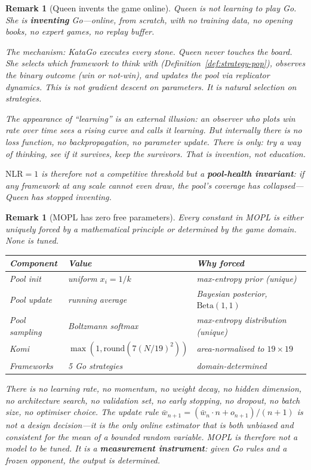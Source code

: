 \documentclass[11pt,a4paper]{article}
\newtheorem{remark}[theorem]{Remark}
\begin{document}
\begin{remark}[Queen invents the game online]\label{rem:queen-invents}
\color{black!60}%
Queen is not learning to play Go.
She is \textbf{inventing} Go---online, from scratch, with no
training data, no opening books, no expert games, no replay buffer.

The mechanism:
KataGo executes every stone.
Queen never touches the board.
She selects \emph{which framework to think with}
(Definition~\ref{def:strategy-pop}),
observes the binary outcome (win or not-win),
and updates the pool via replicator dynamics.
This is not gradient descent on parameters.
It is natural selection on strategies.

The appearance of ``learning'' is an external illusion:
an observer who plots win rate over time sees a rising curve
and calls it learning.
But internally there is no loss function, no backpropagation,
no parameter update.
There is only: try a way of thinking, see if it survives,
keep the survivors.
That is invention, not education.

$\mathrm{NLR} = 1$ is therefore not a competitive threshold
but a \textbf{pool-health invariant}:
if any framework at any scale cannot even draw,
the pool's coverage has collapsed---Queen has stopped inventing.
\end{remark}

\begin{remark}[MOPL has zero free parameters]\label{rem:zero-param}
\color{black!60}%
Every constant in MOPL is either uniquely forced by a mathematical
principle or determined by the game domain.
None is tuned.

\begin{center}
\small
\begin{tabular}{@{}l@{\;\;}l@{\;\;}l@{}}
\toprule
Component & Value & Why forced \\
\midrule
Pool init & uniform $x_i = 1/k$ &
  max-entropy prior (unique) \\
Pool update & running average &
  Bayesian posterior, $\mathrm{Beta}(1,1)$ \\
Pool sampling & Boltzmann softmax &
  max-entropy distribution (unique) \\
Komi & $\max(1, \mathrm{round}(7(N/19)^2))$ &
  area-normalised to $19{\times}19$ \\
Frameworks & 5 Go strategies &
  domain-determined \\
\bottomrule
\end{tabular}
\end{center}

\noindent
There is no learning rate, no momentum, no weight decay,
no hidden dimension, no architecture search,
no validation set, no early stopping, no dropout,
no batch size, no optimiser choice.
The update rule
$\bar{w}_{n+1} = (\bar{w}_n \cdot n + o_{n+1})/(n+1)$
is not a design decision---it is the \emph{only}
online estimator that is both unbiased and consistent
for the mean of a bounded random variable.
MOPL is therefore not a model to be tuned.
It is a \textbf{measurement instrument}:
given Go rules and a frozen opponent,
the output is determined.
\end{remark}
\end{document}
